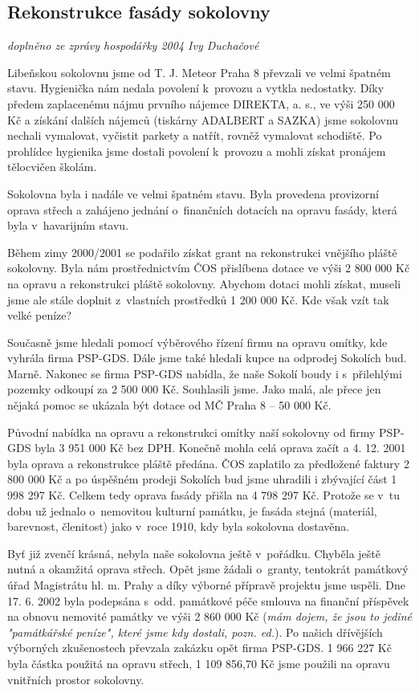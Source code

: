 \documentclass[a5paper, 12pt, twoside]{article}
\begin{document}
\subsection{Rekonstrukce fasády
sokolovny}

\textit{doplněno ze zprávy hospodářky 2004 Ivy Duchačové}

Libeňskou sokolovnu jsme od T. J. Meteor Praha 8 převzali ve velmi
špatném stavu. Hygienička nám nedala povolení k~provozu a vytkla
nedostatky. Díky předem zaplacenému nájmu prvního nájemce DIREKTA, a.
s., ve výši 250 000 Kč a získání dalších nájemců (tiskárny ADALBERT a
SAZKA) jsme sokolovnu nechali vymalovat, vyčistit parkety a natřít,
rovněž vymalovat schodiště. Po prohlídce hygienika jsme dostali povolení
k~provozu a mohli získat pronájem tělocvičen školám.

Sokolovna byla i nadále ve velmi špatném stavu. Byla provedena
provizorní oprava střech a zahájeno jednání o~finančních dotacích na
opravu fasády, která byla v~havarijním stavu.

Během zimy 2000/2001 se podařilo získat grant na rekonstrukci vnějšího
pláště sokolovny. Byla nám prostřednictvím ČOS přislíbena dotace ve výši
2 800 000 Kč na opravu a rekonstrukci pláště sokolovny. Abychom dotaci
mohli získat, museli jsme ale stále doplnit z~vlastních prostředků 1 200
000 Kč. Kde však vzít tak velké peníze?

Současně jsme hledali pomocí výběrového řízení firmu na opravu omítky,
kde vyhrála firma PSP-GDS. Dále jsme také hledali kupce na odprodej
Sokolích bud. Marně. Nakonec se firma PSP-GDS nabídla, že naše Sokolí
boudy i s~přilehlými pozemky odkoupí za 2 500 000 Kč. Souhlasili jsme.
Jako malá, ale přece jen nějaká pomoc se ukázala být dotace od MČ Praha
8 -- 50 000 Kč.

Původní nabídka na opravu a rekonstrukci omítky naší sokolovny od firmy
PSP-GDS byla 3 951 000 Kč bez DPH. Konečně mohla celá oprava začít a 4.
12. 2001 byla oprava a rekonstrukce pláště předána. ČOS zaplatilo za
předložené faktury 2 800 000 Kč a po úspěšném prodeji Sokolích bud jsme
uhradili i zbývající část 1 998 297 Kč. Celkem tedy oprava fasády přišla
na 4 798 297 Kč. Protože se v~tu dobu už jednalo o~nemovitou kulturní
památku, je fasáda stejná (materiál, barevnost, členitost) jako v~roce
1910, kdy byla sokolovna dostavěna.

Byť již zvenčí krásná, nebyla naše sokolovna ještě v~pořádku. Chyběla
ještě nutná a okamžitá oprava střech. Opět jsme žádali o~granty,
tentokrát památkový úřad Magistrátu hl. m. Prahy a díky výborné přípravě
projektu jsme uspěli. Dne 17. 6. 2002 byla podepsána s~odd. památkové
péče smlouva na finanční příspěvek na obnovu nemovité památky ve výši 2
860 000 Kč (\textit{mám dojem, že jsou to jediné "památkářské peníze",
které jsme kdy dostali, pozn. ed.}). Po našich dřívějších výborných
zkušenostech převzala zakázku opět firma PSP-GDS. 1 966 227 Kč byla
částka použitá na opravu střech, 1 109 856,70 Kč jsme použili na opravu
vnitřních prostor sokolovny.
\end{document}
